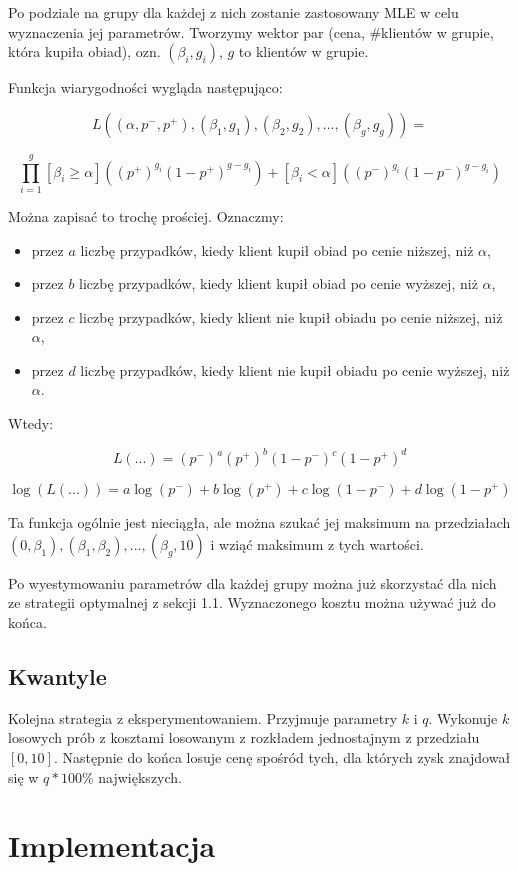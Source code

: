 \documentclass[a4paper,11pt]{article}
\begin{document}
Po podziale na grupy dla każdej z nich zostanie zastosowany MLE w celu wyznaczenia
jej parametrów. Tworzymy wektor par (cena, $\#$klientów w grupie, która kupiła obiad), 
ozn. $(\beta_i, g_i)$, $g$ to klientów w grupie.

Funkcja wiarygodności wygląda następująco:

\[
L((\alpha, p^-, p^+), (\beta_1, g_1), (\beta_2, g_2), ..., (\beta_g, g_g)) =
\]

\[
\prod_{i=1}^{g}[\beta_i \ge \alpha]((p^+)^{g_i}(1-p^+)^{g - g_i}) +
               [\beta_i < \alpha]((p^-)^{g_i}(1-p^-)^{g - g_i})
\]

Można zapisać to trochę prościej. Oznaczmy:

\begin{itemize}
\item przez $a$ liczbę przypadków, kiedy klient kupił obiad po cenie niższej, niż $\alpha$,
\item przez $b$ liczbę przypadków, kiedy klient kupił obiad po cenie wyższej, niż $\alpha$,
\item przez $c$ liczbę przypadków, kiedy klient nie kupił obiadu po cenie niższej, niż $\alpha$,
\item przez $d$ liczbę przypadków, kiedy klient nie kupił obiadu po cenie wyższej, niż $\alpha$. 
\end{itemize}

Wtedy:

\[
L(...) = (p^-)^{a}(p^+)^{b}(1 - p^-)^{c}(1 - p^+)^{d}
\]

\[
\log(L(...)) = a\log(p^-) + b\log(p^+) + c\log(1 - p^-) + d\log(1 - p^+)
\]

Ta funkcja ogólnie jest nieciągła, ale można szukać jej maksimum na przedziałach
$(0, \beta_1), (\beta_1, \beta_2), ..., (\beta_g, 10)$ i wziąć maksimum z tych
wartości.

Po wyestymowaniu parametrów dla każdej grupy można już skorzystać dla
nich ze strategii optymalnej z sekcji 1.1. Wyznaczonego kosztu można używać już
do końca.

\subsection{Kwantyle}
Kolejna strategia z eksperymentowaniem. Przyjmuje parametry $k$ i $q$. Wykonuje
$k$ losowych prób z kosztami losowanym z rozkładem jednostajnym z przedziału $[0, 10]$.
Następnie do końca losuje cenę spośród tych, dla których zysk znajdował się w $q*100\%$
największych.

\section{Implementacja}
\end{document}
